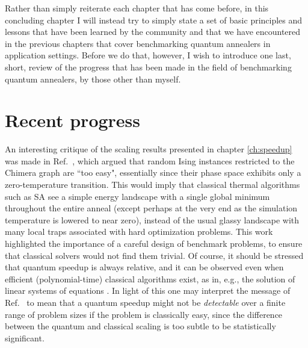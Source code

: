 
Rather than simply reiterate each chapter that has come before, in this concluding chapter I will instead try to simply state a set of basic principles and lessons that have been learned by the community and that we have encountered in the previous chapters that cover benchmarking quantum annealers in application settings. Before we do that, however, I wish to introduce one last, short, review of the progress that has been made in the field of benchmarking quantum annealers, by those other than myself.

\section{Recent progress}
An interesting critique of the scaling results presented in chapter \ref{ch:speedup} was made in Ref.~\cite{2014Katzgraber}, which argued that random Ising instances restricted to the Chimera graph are ``too easy", essentially since their phase space exhibits only a zero-temperature transition. This would imply that classical thermal algorithms such as SA see a simple energy landscape with a single global minimum throughout the entire anneal (except perhaps at the very end as the simulation temperature is lowered to near zero), instead of the usual glassy landscape with many local traps associated with hard optimization problems. This work highlighted the importance of a careful design of benchmark problems, to ensure that classical solvers would not find them trivial. Of course, it should be stressed that quantum speedup is always relative, and it can be observed even when efficient (polynomial-time) classical algorithms exist, as in, e.g., the solution of linear systems of equations \cite{PhysRevLett.103.150502}. In light of this one may interpret the message of Ref.~\cite{2014Katzgraber} to mean that a quantum speedup might not be \emph{detectable} over a finite range of problem sizes if the problem is classically easy, since the difference between the quantum and classical scaling is too subtle to be statistically significant.

